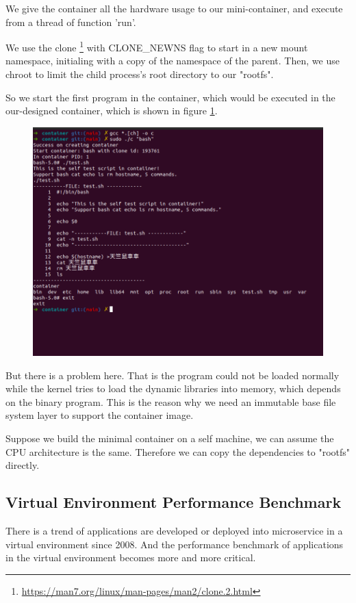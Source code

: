 We give the container all the hardware usage to our mini-container, and execute from a thread of
function 'run'.

We use the clone \footnote{\url{https://man7.org/linux/man-pages/man2/clone.2.html}} with
CLONE\_NEWNS flag to start in a new mount namespace, initialing with a copy of the
namespace of the parent. Then, we use chroot to limit the child process's root directory
to our "rootfs".

So we start the first program in the container, which would be executed in the
our-designed container, which is shown in figure \ref{lc}.
    {
        \begin{figure}
            \centering
            \includegraphics[width=.5\textwidth]{src/cur_cont.png}
            \label{lc}
        \end{figure}
    }


But there is a problem here. That is the program could not be loaded normally while
the kernel tries to load the dynamic libraries into memory, which depends on the
binary program. This is the reason why we need an immutable base file system layer to
support the container image.

Suppose we build the minimal container on a self machine, we can assume the CPU architecture
is the same. Therefore we can copy the dependencies to "rootfs" directly.



\subsection{Virtual Environment Performance Benchmark}
There is a trend of applications are developed or deployed into microservice in a virtual
environment since 2008. And the performance benchmark of applications in the virtual
environment becomes more and more critical.

